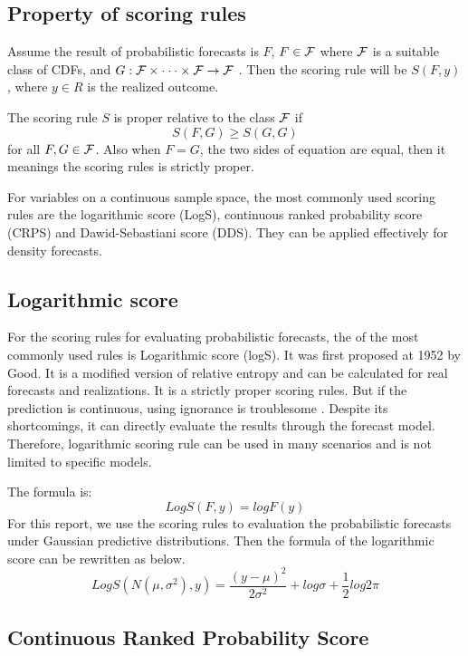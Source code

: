 \documentclass{monashthesis}
\theoremstyle{definition}
\theoremstyle{definition}
\theoremstyle{definition}
\theoremstyle{remark}
\begin{document}
\subsection{Property of scoring rules}\label{property-of-scoring-rules}

Assume the result of probabilistic forecasts is \(F\), \(F \in \cal{F}\)
where \(\cal{F}\) is a suitable class of CDFs, and
\(G:\cal{F\times\cdot\cdot\cdot\times F\to F}\) . Then the scoring rule
will be \(S(F,y)\), where \(y \in R\) is the realized outcome.

The scoring rule \(S\) is proper relative to the class \(\cal{F}\) if
\[S(F,G)\geq S(G,G)\] for all \(F,G \in \cal{F}\). Also when \(F=G\),
the two sides of equation are equal, then it meanings the scoring rules
is strictly proper.

For variables on a continuous sample space, the most commonly used
scoring rules are the logarithmic score (LogS), continuous ranked
probability score (CRPS) and Dawid-Sebastiani score (DDS). They can be
applied effectively for density forecasts.

\subsection{Logarithmic score}\label{logarithmic-score}

For the scoring rules for evaluating probabilistic forecasts, the of the
most commonly used rules is Logarithmic score (logS). It was first
proposed at 1952 by Good. It is a modified version of relative entropy
and can be calculated for real forecasts and
realizations.\textcite{RS02} It is a strictly proper scoring rules. But
if the prediction is continuous, using ignorance is troublesome
\textcite{P10}. Despite its shortcomings, it can directly evaluate the
results through the forecast model. Therefore, logarithmic scoring rule
can be used in many scenarios and is not limited to specific models.

The formula is: \[
      LogS(F,y)=logF(y)
  \] For this report, we use the scoring rules to evaluation the
probabilistic forecasts under Gaussian predictive distributions. Then
the formula of the logarithmic score can be rewritten as below. \[
      LogS(N(\mu,\sigma^2),y)=\frac{(y-\mu)^2}{2\sigma^2}+log\sigma+\frac{1}{2}log2\pi
  \]

\subsection{Continuous Ranked Probability
Score}\label{continuous-ranked-probability-score}
\end{document}
